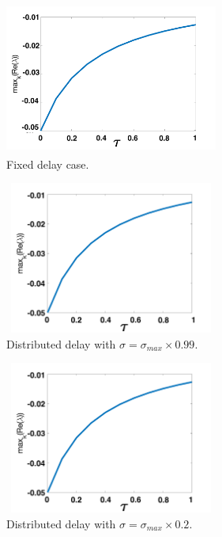 \begin{figure}[H]
    \centering
    \begin{subfigure}[b]{0.45\textwidth}
        \centering
        \includegraphics[width=7cm,height=5cm]{p3fixed.png}
        \caption{Fixed delay case.}
        \label{}
    \end{subfigure}
    \hfill
    \begin{subfigure}[b]{0.45\textwidth}
        \centering
        \includegraphics[width=7cm,height=5cm]{p3sigmax.png}
        \caption{Distributed delay with $\sigma=\sigma_{max}\times0.99$.}
        \label{}
    \end{subfigure}
    \hfill
    \begin{subfigure}[b]{0.45\textwidth}
        \centering
        \includegraphics[width=7cm,height=5cm]{p3sigmax5.png}
        \caption{Distributed delay with $\sigma=\sigma_{max}\times0.2$.}
        \label{}
    \end{subfigure}
    \hfill
    \begin{subfigure}[b]{0.45\textwidth}
        \centering

\end{subfigure}
\end{figure}
